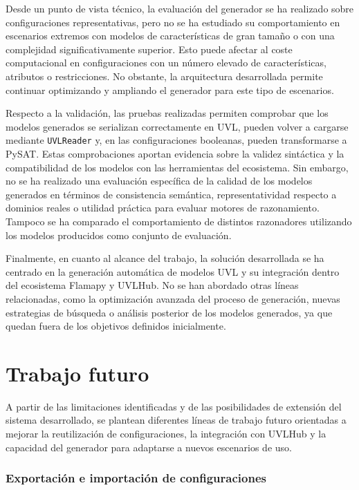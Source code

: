 Desde un punto de vista técnico, la evaluación del generador se ha realizado
sobre configuraciones representativas, pero no se ha estudiado su comportamiento
en escenarios extremos con modelos de características de gran tamaño o con una
complejidad significativamente superior. Esto puede afectar al coste
computacional en configuraciones con un número elevado de características,
atributos o restricciones. No obstante, la arquitectura desarrollada permite
continuar optimizando y ampliando el generador para este tipo de escenarios.

Respecto a la validación, las pruebas realizadas permiten comprobar que los
modelos generados se serializan correctamente en UVL, pueden volver a cargarse
mediante \texttt{UVLReader} y, en las configuraciones booleanas, pueden
transformarse a PySAT. Estas comprobaciones aportan evidencia sobre la validez
sintáctica y la compatibilidad de los modelos con las herramientas del
ecosistema. Sin embargo, no se ha realizado una evaluación específica de la
calidad de los modelos generados en términos de consistencia semántica,
representatividad respecto a dominios reales o utilidad práctica para evaluar
motores de razonamiento. Tampoco se ha comparado el comportamiento de distintos
razonadores utilizando los modelos producidos como conjunto de evaluación.

Finalmente, en cuanto al alcance del trabajo, la solución desarrollada se ha
centrado en la generación automática de modelos UVL y su integración dentro del
ecosistema Flamapy y UVLHub. No se han abordado otras líneas relacionadas, como
la optimización avanzada del proceso de generación, nuevas estrategias de
búsqueda o análisis posterior de los modelos generados, ya que quedan fuera de
los objetivos definidos inicialmente.

\section{Trabajo futuro}
\label{sec:trabajo_futuro}


A partir de las limitaciones identificadas y de las posibilidades de extensión
del sistema desarrollado, se plantean diferentes líneas de trabajo futuro
orientadas a mejorar la reutilización de configuraciones, la integración con
UVLHub y la capacidad del generador para adaptarse a nuevos escenarios de uso.

\subsubsection*{Exportación e importación de configuraciones}

